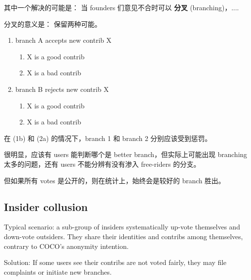 \documentclass[12pt, orivec]{article}
\newcommand{\cc}[2]{#1}
\newcommand{\cc}[2]{#2}
\begin{document}
\cc{
其中一个解决的可能是： 当 founders 们意见不合时可以 \textbf{分叉} (branching)，....
}{
A possible solution is via \textbf{branching} when founders disagree with each other.
}

\cc{
分叉的意义是： 保留两种可能。 
}{
The essence of branching is:  to preserve both options in a disagreement.
}

\begin{enumerate}
	\item branch A accepts new contrib X
	\begin{enumerate}
		\item X is a good contrib
		\item X is a bad contrib
	\end{enumerate}
	\item branch B rejects new contrib X
	\begin{enumerate}
		\item X is a good contrib
		\item X is a bad contrib
	\end{enumerate}
\end{enumerate}

\cc{
在 (1b) 和 (2a) 的情况下，branch 1 和 branch 2 分别应该受到惩罚。
}{
In cases (1b) and (2a), branch 1 and 2 should be penalized respectively.
}

\cc{
很明显，应该有 users 能判断哪个是 better branch，但实际上可能出现 branching 太多的问题，还有 users 不能分辨有没有渗入 free-riders 的分支。 
}{
Obviously, there should exist users who can determine which branches are better, but in practice there may be too many branches to consider.  Users may be unable to tell which branches are contaminated with free-riders. 
}

\cc{
但如果所有 votes 是公开的，则在统计上，始终会是较好的 branch 胜出。 
}{
However, if all votes are openly visible, then statistically we may believe that good branches will win out eventually.	
}

\secttoc
\subsection{Insider collusion}

Typical scenario:  a sub-group of insiders systematically up-vote themselves and down-vote outsiders.  They share their identities and contribs among themselves, contrary to COCO's anonymity intention.

Solution:  If some users see their contribs are not voted fairly, they may file complaints or initiate new branches.
\end{document}
